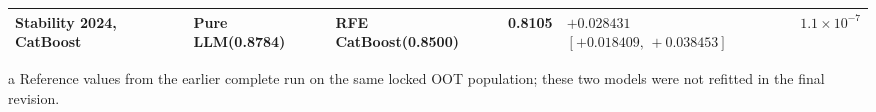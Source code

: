 \documentclass[final,5p,twocolumn]{elsarticle}
\begin{document}
\begin{table}[htbp]
\begin{threeparttable}
\begin{tabular}{@{}L{21mm}L{25mm}L{22mm}rL{36mm}r@{}}
Stability 2024, CatBoost & Pure LLM\newline (0.8784) & RFE CatBoost\newline (0.8500) & 0.8105 & $+0.028431$\newline $[+0.018409,\,+0.038453]$ & $1.1\times10^{-7}$ \\
\bottomrule
\end{tabular}
\begin{tablenotes}\scriptsize
\item[a] Reference values from the earlier complete run on the same locked OOT population; these two models were not refitted in the final revision.
\end{tablenotes}
\end{threeparttable}
\end{table}
\end{document}
